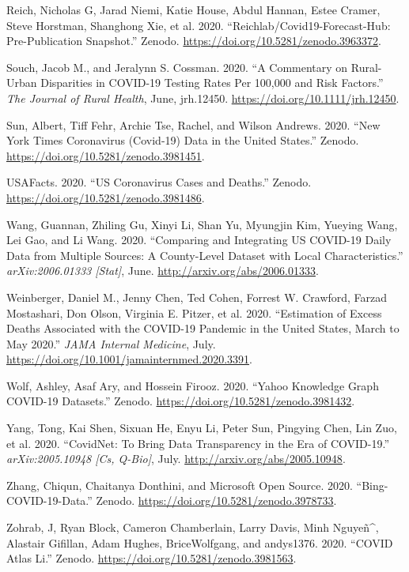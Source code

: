 \documentclass[10pt,letterpaper]{article}
\begin{document}
\leavevmode\hypertarget{ref-nicholasgreichReichlabCovid19forecasthubPrepublication2020}{}%
Reich, Nicholas G, Jarad Niemi, Katie House, Abdul Hannan, Estee Cramer,
Steve Horstman, Shanghong Xie, et al. 2020.
``Reichlab/Covid19-Forecast-Hub: Pre-Publication Snapshot.'' Zenodo.
\url{https://doi.org/10.5281/zenodo.3963372}.

\leavevmode\hypertarget{ref-souchCommentaryRuralUrban2020}{}%
Souch, Jacob M., and Jeralynn S. Cossman. 2020. ``A Commentary on
Rural-Urban Disparities in COVID-19 Testing Rates Per 100,000 and Risk
Factors.'' \emph{The Journal of Rural Health}, June, jrh.12450.
\url{https://doi.org/10.1111/jrh.12450}.

\leavevmode\hypertarget{ref-albertsunNewYorkTimes2020}{}%
Sun, Albert, Tiff Fehr, Archie Tse, Rachel, and Wilson Andrews. 2020.
``New York Times Coronavirus (Covid-19) Data in the United States.''
Zenodo. \url{https://doi.org/10.5281/zenodo.3981451}.

\leavevmode\hypertarget{ref-usafactsUSCoronavirusCases2020}{}%
USAFacts. 2020. ``US Coronavirus Cases and Deaths.'' Zenodo.
\url{https://doi.org/10.5281/zenodo.3981486}.

\leavevmode\hypertarget{ref-wangComparingIntegratingUS2020}{}%
Wang, Guannan, Zhiling Gu, Xinyi Li, Shan Yu, Myungjin Kim, Yueying
Wang, Lei Gao, and Li Wang. 2020. ``Comparing and Integrating US
COVID-19 Daily Data from Multiple Sources: A County-Level Dataset with
Local Characteristics.'' \emph{arXiv:2006.01333 {[}Stat{]}}, June.
\url{http://arxiv.org/abs/2006.01333}.

\leavevmode\hypertarget{ref-weinbergerEstimationExcessDeaths2020}{}%
Weinberger, Daniel M., Jenny Chen, Ted Cohen, Forrest W. Crawford,
Farzad Mostashari, Don Olson, Virginia E. Pitzer, et al. 2020.
``Estimation of Excess Deaths Associated with the COVID-19 Pandemic in
the United States, March to May 2020.'' \emph{JAMA Internal Medicine},
July. \url{https://doi.org/10.1001/jamainternmed.2020.3391}.

\leavevmode\hypertarget{ref-ashleywolfYahooKnowledgeGraph2020}{}%
Wolf, Ashley, Asaf Ary, and Hossein Firooz. 2020. ``Yahoo Knowledge
Graph COVID-19 Datasets.'' Zenodo.
\url{https://doi.org/10.5281/zenodo.3981432}.

\leavevmode\hypertarget{ref-yangCovidNetBringData2020}{}%
Yang, Tong, Kai Shen, Sixuan He, Enyu Li, Peter Sun, Pingying Chen, Lin
Zuo, et al. 2020. ``CovidNet: To Bring Data Transparency in the Era of
COVID-19.'' \emph{arXiv:2005.10948 {[}Cs, Q-Bio{]}}, July.
\url{http://arxiv.org/abs/2005.10948}.

\leavevmode\hypertarget{ref-chiqunzhangBingCOVID19Data2020}{}%
Zhang, Chiqun, Chaitanya Donthini, and Microsoft Open Source. 2020.
``Bing-COVID-19-Data.'' Zenodo.
\url{https://doi.org/10.5281/zenodo.3978733}.

\leavevmode\hypertarget{ref-jzohrabCOVIDAtlasLi2020}{}%
Zohrab, J, Ryan Block, Cameron Chamberlain, Larry Davis, Minh
Nguyeñ\^{}, Alastair Gifillan, Adam Hughes, BriceWolfgang, and
andys1376. 2020. ``COVID Atlas Li.'' Zenodo.
\url{https://doi.org/10.5281/zenodo.3981563}.

\nolinenumbers
\end{document}
